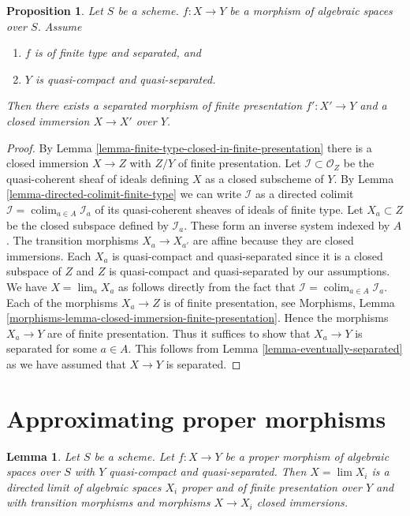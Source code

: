 \documentclass{stacks-project}
\theoremstyle{plain}
\newtheorem{proposition}[subsection]{Proposition}
\newtheorem{lemma}[subsection]{Lemma}
\theoremstyle{definition}
\theoremstyle{remark}
\numberwithin{equation}{subsection}
\def\lim{\mathop{\mathrm{lim}}\nolimits}
\def\colim{\mathop{\mathrm{colim}}\nolimits}
\begin{document}
\begin{proposition}
\label{proposition-separated-closed-in-finite-presentation}
Let $S$ be a scheme. $f : X \to Y$ be a morphism of algebraic spaces
over $S$. Assume
\begin{enumerate}
\item $f$ is of finite type and separated, and
\item $Y$ is quasi-compact and quasi-separated.
\end{enumerate}
Then there exists a separated morphism of finite presentation
$f' : X' \to Y$ and a closed immersion $X \to X'$ over $Y$.
\end{proposition}

\begin{proof}
By Lemma \ref{lemma-finite-type-closed-in-finite-presentation}
there is a closed immersion $X \to Z$ with $Z/Y$ of
finite presentation. Let $\mathcal{I} \subset \mathcal{O}_Z$
be the quasi-coherent sheaf of ideals defining $X$ as a closed
subscheme of $Y$. By
Lemma \ref{lemma-directed-colimit-finite-type}
we can write $\mathcal{I}$ as a directed colimit
$\mathcal{I} = \colim_{a \in A} \mathcal{I}_a$ of its
quasi-coherent sheaves of ideals of finite type.
Let $X_a \subset Z$ be the closed subspace defined by $\mathcal{I}_a$.
These form an inverse system indexed by $A$.
The transition morphisms $X_a \to X_{a'}$ are affine because
they are closed immersions. Each $X_a$ is quasi-compact and quasi-separated
since it is a closed subspace of $Z$ and $Z$ is quasi-compact and
quasi-separated by our assumptions.
We have $X = \lim_a X_a$ as follows directly from the
fact that $\mathcal{I} = \colim_{a \in A} \mathcal{I}_a$.
Each of the morphisms $X_a \to Z$ is of finite presentation, see
Morphisms, Lemma \ref{morphisms-lemma-closed-immersion-finite-presentation}.
Hence the morphisms $X_a \to Y$ are of finite presentation.
Thus it suffices to show that $X_a \to Y$ is separated for some
$a \in A$. This follows from Lemma \ref{lemma-eventually-separated}
as we have assumed that $X \to Y$ is separated.
\end{proof}






\section{Approximating proper morphisms}
\label{section-approximate-proper}

\begin{lemma}
\label{lemma-proper-limit-of-proper-finite-presentation}
Let $S$ be a scheme. Let $f : X \to Y$ be a proper morphism of algebraic
spaces over $S$ with $Y$ quasi-compact and quasi-separated. Then
$X = \lim X_i$ is a directed limit of algebraic spaces $X_i$
proper and of finite presentation over $Y$ and with transition
morphisms and morphisms $X \to X_i$ closed immersions.
\end{lemma}
\end{document}
